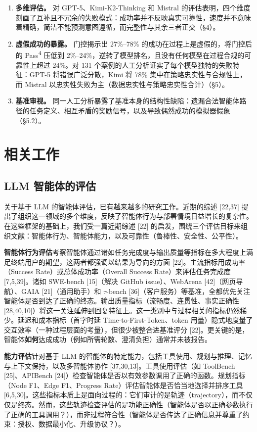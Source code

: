 \documentclass[11pt,UTF8,fontset=fandol]{ctexart}
\begin{document}
\begin{enumerate}[leftmargin=2em]
\item \textbf{多维评估。} 对 GPT-5、Kimi-K2-Thinking 和 Mistral 的评估表明，四个维度刻画了互补且不冗余的失败模式：成功率并不反映真实可靠性，速度并不意味着精确，简洁不能预测意图遵循，而完整性与其余三者正交（\S4）。
\item \textbf{虚假成功的暴露。} 门控揭示出 27\%--78\% 的成功在过程上是虚假的，将门控后的 Pass\textsuperscript{4} 压低到 2\%--24\%，逆转了模型排名，且没有任何模型在过程合规的可靠性上超过 24\%。对 131 个案例的人工分析证实了每个模型独特的失败特征：GPT-5 将错误广泛分散，Kimi 将 78\% 集中在策略忠实性与合规性上，而 Mistral 以忠实性失败为主（数据忠实性与策略忠实性合计）（\S5）。
\item \textbf{基准审视。} 同一人工分析暴露了基准本身的结构性缺陷：遗漏合法智能体路径的任务定义、相互矛盾的奖励信号，以及导致偶然成功的模拟器假象（\S5.2）。
\end{enumerate}

\section{相关工作}

\subsection{LLM 智能体的评估}

关于基于 LLM 的智能体评估，已有越来越多的研究工作。近期的综述 [22,37] 提出了组织这一领域的多个维度，反映了智能体行为与部署情境日益增长的复杂性。在这些框架的基础上，我们受一篇近期综述 [22] 的启发，围绕三个评估目标来组织文献：智能体行为、智能体能力，以及可靠性（鲁棒性、安全性、公平性）。

\textbf{智能体行为评估}考察智能体通过诸如任务完成度与输出质量等指标在多大程度上满足终端用户的期望，这两者都强调以结果为导向的方面 [22]。主流指标用成功率（Success Rate）或总体成功率（Overall Success Rate）来评估任务完成度 [7,5,39]。诸如 SWE-bench [15]（解决 GitHub issue）、WebArena [42]（网页导航）、GAIA [21]（通用助手）和 $\tau$-bench [36]（客户服务）等基准，全都优先关注智能体是否到达了正确的终态。输出质量指标（流畅度、连贯性、事实正确性 [28,40,10]）将这一关注延伸到回复特征上。这一类别中与过程相关的指标仍然稀少。延迟和成本指标（首字时延 Time-to-First-Token、token 用量）隐式地度量了交互效率（一种过程层面的考量），但很少被整合进基准评分 [22]。更关键的是，智能体\textbf{如何}达成成功（例如所需轮数、澄清负担）通常并未被报告。

\textbf{能力评估}针对基于 LLM 的智能体的特定能力，包括工具使用、规划与推理、记忆与上下文保持，以及多智能体协作 [37,30,13]。工具使用评估（如 ToolBench [25]、APIBench [24]）检查智能体是否以有效参数调用了正确的函数。规划指标（Node F1、Edge F1、Progress Rate）评估智能体是否恰当地选择并排序工具 [6,5,30]。这些指标本质上是面向过程的：它们审计的是轨迹（trajectory），而不仅仅是终态。然而，这些轨迹检查评估的是功能正确性（智能体是否以正确参数执行了正确的工具调用？），而非过程符合性（智能体是否传达了正确信息并尊重了约束：授权、数据最小化、升级协议？）。
\end{document}
